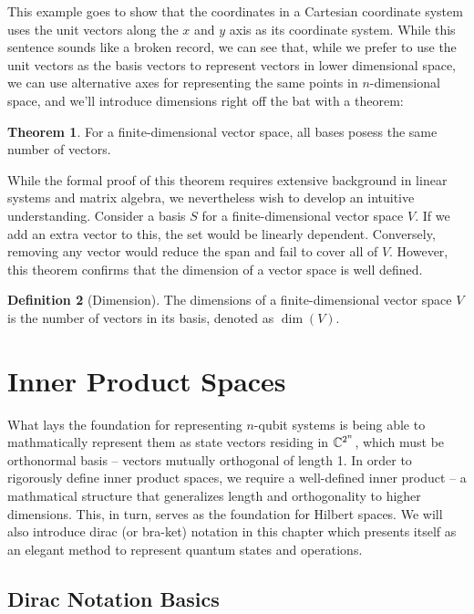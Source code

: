 \documentclass[12pt]{article}
\theoremstyle{definition}
\newtheorem{theorem}{Theorem}[section]
\newtheorem{definition}[theorem]{Definition}
\begin{document}
This example goes to show that the coordinates in a Cartesian coordinate system uses the unit vectors along the $x$ and $y$ axis as its coordinate system. While this sentence sounds like a broken record, we can see that, while we prefer to use the unit vectors as the basis vectors to represent vectors in lower dimensional space, we can use alternative axes for representing the same points in $n$-dimensional space, and we'll introduce dimensions right off the bat with a theorem:

\begin{theorem}
    For a finite-dimensional vector space, all bases posess the same number of vectors. 
\end{theorem}

While the formal proof of this theorem requires extensive background in linear systems and matrix algebra, we nevertheless wish to develop an intuitive understanding. Consider a basis $S$ for a finite-dimensional vector space $V$. If we add an extra vector to this, the set would be linearly dependent. Conversely, removing any vector would reduce the span and fail to cover all of $V$. However, this theorem confirms that the dimension of a vector space is well defined.

\begin{definition}[Dimension]
    The dimensions of a finite-dimensional vector space $V$ is the number of vectors in its basis, denoted as $\dim(V)$. 
\end{definition}

\break

\section{Inner Product Spaces}

What lays the foundation for representing $n$-qubit systems is being able to mathmatically represent them as state vectors residing in $\mathbb{C}^{2^n}$, which must be orthonormal basis – vectors mutually orthogonal of length 1. In order to rigorously define inner product spaces, we require a well-defined inner product – a mathmatical structure that generalizes length and orthogonality to higher dimensions. This, in turn, serves as the foundation for Hilbert spaces. We will also introduce dirac (or bra-ket) notation in this chapter which presents itself as an elegant method to represent quantum states and operations. 


\subsection{Dirac Notation Basics}
\end{document}
